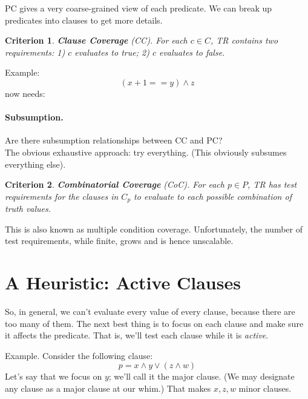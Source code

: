 \documentclass[11pt]{article}
\newtheorem{crit}{Criterion}
\begin{document}
PC gives a very coarse-grained view of each predicate.
We can break up predicates into clauses to get more details.

\begin{crit}
{\bf Clause Coverage} (CC). For each $c \in C$, TR contains two requirements:
1) $c$ evaluates to true; 2) $c$ evaluates to false.
\end{crit}

{\sf Example:} ~\\[2em]
\[ (x + 1 == y) \wedge z\] now needs:

\paragraph{Subsumption.} Are there subsumption relationships between 
CC and PC?\\[3em]


The obvious exhaustive approach: try everything. (This obviously subsumes
everything else).

\begin{crit}
{\bf Combinatorial Coverage} (CoC). For each $p \in P$, TR has test
requirements for the clauses in $C_p$ to evaluate to each possible
combination of truth values.
\end{crit}

This is also known as multiple condition coverage. Unfortunately, the
number of test requirements, while finite, grows
\underline{\hspace*{7em}} and is hence unscalable.


\section*{A Heuristic: Active Clauses}
So, in general, we can't evaluate every value of every clause, because
there are too many of them. The next best thing is to focus on each
clause and make sure it affects the predicate. That is, we'll test
each clause while it is \emph{active}.

{\sf Example.} Consider the following clause:
\[ p = x \wedge y \vee (z \wedge w) \]
Let's say that we focus on $y$; we'll call it the major clause.  (We
may designate any clause as a major clause at our whim.)  That makes $x, z, w$
minor clauses.
\end{document}
